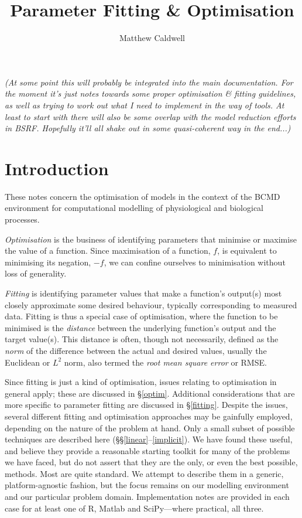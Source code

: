 \documentclass[a4paper,11pt]{article}
\title{Parameter Fitting \& Optimisation}
\author{Matthew Caldwell}
\begin{document}
\maketitle

\textit{(At some point this will probably be integrated into the main documentation. For the moment it's just notes towards some proper optimisation \& fitting guidelines, as well as trying to work out what I need to implement in the way of tools. At least to start with there will also be some overlap with the model reduction efforts in BSRF. Hopefully it'll all shake out in some quasi-coherent way in the end...)}

\section{Introduction}\label{intro}

These notes concern the optimisation of models in the context of the BCMD environment for computational modelling of physiological and biological processes.

\textit{Optimisation} is the business of identifying parameters that minimise or maximise the value of a function. Since maximisation of a function, $f$, is equivalent to minimising its negation, $-f$, we can confine ourselves to minimisation without loss of generality.

\textit{Fitting} is identifying parameter values that make a function's output(s) most closely approximate some desired behaviour, typically corresponding to measured data. Fitting is thus a special case of optimisation, where the function to be minimised is the \textit{distance} between the underlying function's output and the target value(s). This distance is often, though not necessarily, defined as the \textit{norm} of the difference between the actual and desired values, usually the Euclidean or $L^2$ norm, also termed the \textit{root mean square error} or RMSE.

Since fitting is just a kind of optimisation, issues relating to optimisation in general apply; these are discussed in \S\ref{optim}. Additional considerations that are more specific to parameter fitting are discussed in \S\ref{fitting}. Despite the issues, several different fitting and optimisation approaches may be gainfully employed, depending on the nature of the problem at hand. Only a small subset of possible techniques are described here (\S\S\ref{linear}--\ref{implicit}). We have found these useful, and believe they provide a reasonable starting toolkit for many of the problems we have faced, but do not assert that they are the only, or even the best possible, methods. Most are quite standard. We attempt to describe them in a generic, platform-agnostic fashion, but the focus remains on our modelling environment and our particular problem domain. Implementation notes are provided in each case for at least one of R, Matlab and SciPy---where practical, all three.
\end{document}
